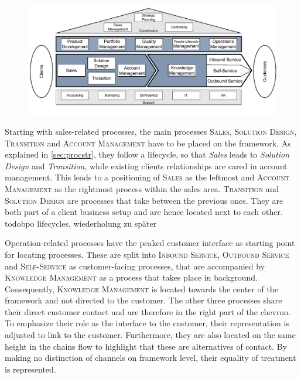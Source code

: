 		\begin{figure}[caption={Framework}, label={fig:framework}]
		{	\includegraphics[width=.99\textwidth]{figures/framework_full.pdf}}
	\end{figure} 
	
	
	 Starting with sales-related processes, the main processes \textsc{Sales}, \textsc{Solution Design}, \textsc{Transition} and \textsc{Account Management} have to be placed on the framework. As explained in \ref{sec:procstr}, they follow a lifecycle, so that \textit{Sales} leads to \textit{Solution Design} and \textit{Transition}, while existing clients relationships are cared in account management. This leads to a positioning of \textsc{Sales} as the leftmost and \textsc{Account Management} as the rightmost process within the sales area. \textsc{Transition} and \textsc{Solution Design} are processes that take between the previous ones. They are both part of a client business setup and are hence located next to each other. todo{bpo lifecycles, wiederholung zu später}
	 
	 Operation-related processes have the peaked customer interface as starting point for locating processes. These are split into \textsc{Inbound Service}, \textsc{Outbound Service} and \textsc{Self-Service} as customer-facing processes, that are accompanied by \textsc{Knowledge Management} as a process that takes place in background. Consequently, \textsc{Knowledge Management} is located towards the center of the framework and not directed to the customer. The other three processes share their direct customer contact and are therefore in the right part of the chevron. To emphasize their role as the interface to the customer, their representation is adjusted to link to the customer. Furthermore, they are also located on the same height in the chains flow to highlight that these are alternatives of contact. By making no distinction of channels on framework level, their equality of treatment is represented. 
	 
